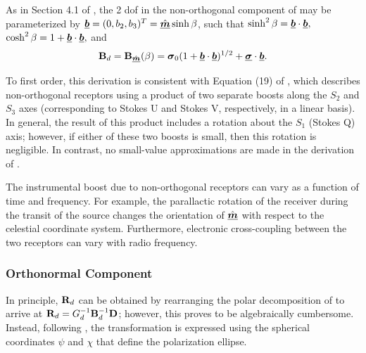 As in Section 4.1 of \cite{van04c}, the 2 dof
in the non-orthogonal component of  may be parameterized by 
$\underline{\mbox{\boldmath $b$}} = (0, b_2, b_3)^T = \hat{\underline{\mbox{\boldmath $m$}}} \sinh\beta$, such that
$\sinh^2\beta = \underline{\mbox{\boldmath $b$}}\cdot\underline{\mbox{\boldmath $b$}},$ $\cosh^2\beta=1+\underline{\mbox{\boldmath $b$}}\cdot\underline{\mbox{\boldmath $b$}},$ and
\begin{equation}
\label{eqn:nonorthogonal_component}
{\bf B}_d = {\bf B}_{\hat{\underline{\mbox{\scriptsize\boldmath $m$}}}}(\beta) = \mbox{\boldmath $\sigma$}_{0} (1 + \underline{\mbox{\boldmath $b$}}\cdot\underline{\mbox{\boldmath $b$}})^{1/2} + \underline{\mbox{\boldmath $\sigma$}}\cdot\underline{\mbox{\boldmath $b$}}.
\end{equation}

To first order, this derivation is consistent with Equation (19) of \cite{bri00},
which describes non-orthogonal receptors using a product of two separate boosts along 
the $S_2$ and $S_3$ axes (corresponding to Stokes U and Stokes V, respectively, in a linear basis).
%
In general, the result of this product includes a rotation about the $S_1$ (Stokes Q) axis;
%
however, if either of these two boosts is small, then this rotation is negligible.
%
In contrast, no small-value approximations are made in the derivation of .
%
%

The instrumental boost due to non-orthogonal receptors can vary as a function of time and frequency.
For example, the parallactic rotation of
the receiver during the transit of the source changes the orientation
of $\hat{\underline{\mbox{\boldmath $m$}}}$ with respect to the celestial coordinate system.
%
Furthermore, electronic cross-coupling between the two receptors can vary with radio frequency.


\subsubsection{Orthonormal Component}
\label{sec:basis_rotation}

In principle, ${\bf R}_d$ can be obtained
%
by rearranging the polar decomposition of  to arrive at
${\bf R}_d = G_d^{-1} {\bf B}_d^{-1} {\bf D}$; however, this proves to
be algebraically cumbersome.
%
Instead, following \cite{bri00}, the transformation is expressed using 
the spherical coordinates $\psi$ and $\chi$ that define the polarization ellipse.

